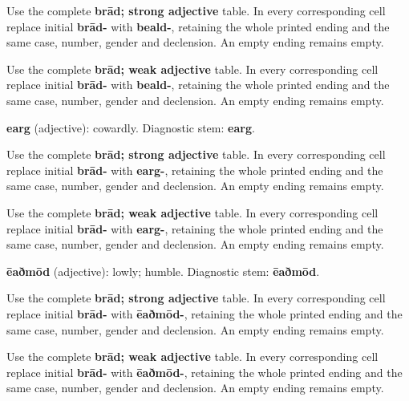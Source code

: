 Use the complete \textbf{brād; strong adjective} table. In every corresponding cell replace initial \textbf{brād-} with \textbf{beald-}, retaining the whole printed ending and the same case, number, gender and declension. An empty ending remains empty.

Use the complete \textbf{brād; weak adjective} table. In every corresponding cell replace initial \textbf{brād-} with \textbf{beald-}, retaining the whole printed ending and the same case, number, gender and declension. An empty ending remains empty.

\textbf{earg} (adjective): cowardly. Diagnostic stem: \textbf{earg}.

Use the complete \textbf{brād; strong adjective} table. In every corresponding cell replace initial \textbf{brād-} with \textbf{earg-}, retaining the whole printed ending and the same case, number, gender and declension. An empty ending remains empty.

Use the complete \textbf{brād; weak adjective} table. In every corresponding cell replace initial \textbf{brād-} with \textbf{earg-}, retaining the whole printed ending and the same case, number, gender and declension. An empty ending remains empty.

\textbf{ēaðmōd} (adjective): lowly; humble. Diagnostic stem: \textbf{ēaðmōd}.

Use the complete \textbf{brād; strong adjective} table. In every corresponding cell replace initial \textbf{brād-} with \textbf{ēaðmōd-}, retaining the whole printed ending and the same case, number, gender and declension. An empty ending remains empty.

Use the complete \textbf{brād; weak adjective} table. In every corresponding cell replace initial \textbf{brād-} with \textbf{ēaðmōd-}, retaining the whole printed ending and the same case, number, gender and declension. An empty ending remains empty.

